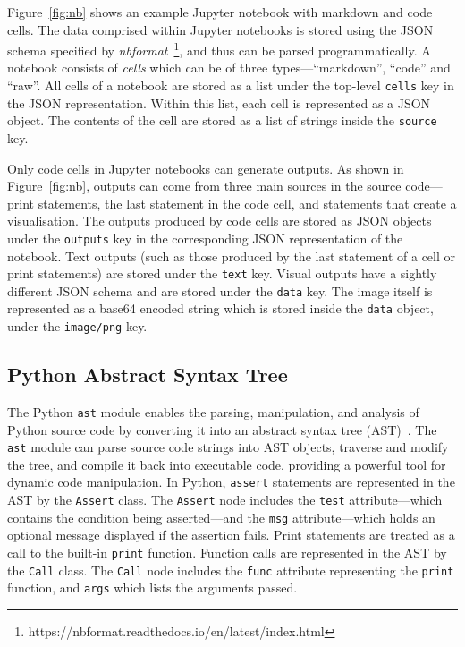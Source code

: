 Figure~\ref{fig:nb} shows an example Jupyter notebook with markdown and code cells. The data comprised within Jupyter notebooks is stored using the JSON schema specified by \emph{nbformat}~\footnote{https://nbformat.readthedocs.io/en/latest/index.html}, and thus can be parsed programmatically. A notebook consists of \emph{cells} which can be of three types---``markdown'', ``code'' and ``raw''. All cells of a notebook are stored as a list under the top-level \lstinline[language={}]$cells$ key in the JSON representation. Within this list, each cell is represented as a JSON object. The contents of the cell are stored as a list of strings inside the \lstinline[language={}]$source$ key.

Only code cells in Jupyter notebooks can generate outputs. As shown in Figure~\ref{fig:nb}, outputs can come from three main sources in the source code---print statements, the last statement in the code cell, and statements that create a visualisation. The outputs produced by code cells are stored as JSON objects under the \lstinline[language={}]$outputs$ key in the corresponding JSON representation of the notebook. Text outputs (such as those produced by the last statement of a cell or print statements) are stored under the \lstinline[language={}]$text$ key. Visual outputs have a sightly different JSON schema and are stored under the \lstinline[language={}]$data$ key. The image itself is represented as a base64 encoded string which is stored inside the \lstinline[language={}]$data$ object, under the \lstinline[language={}]$image/png$ key.

\subsection{Python Abstract Syntax Tree}

The Python \lstinline{ast} module enables the parsing, manipulation, and analysis of Python source code by converting it into an abstract syntax tree (AST)~\cite{pythonast}. The \lstinline{ast} module can parse source code strings into AST objects, traverse and modify the tree, and compile it back into executable code, providing a powerful tool for dynamic code manipulation. In Python, \lstinline{assert} statements are represented in the AST by the \lstinline{Assert} class. The \lstinline{Assert} node includes the \lstinline{test} attribute---which contains the condition being asserted---and the \lstinline{msg} attribute---which holds an optional message displayed if the assertion fails. Print statements are treated as a call to the built-in \lstinline{print} function. Function calls are represented in the AST by the \lstinline{Call} class. The \lstinline{Call} node includes the \lstinline{func} attribute representing the \lstinline{print} function, and \lstinline{args} which lists the arguments passed.


